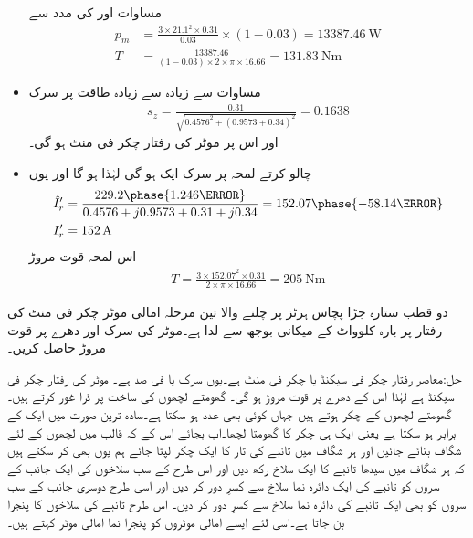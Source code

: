 \begin{itemize}
مساوات   اور   کی مدد سے
\begin{align*}
p_m&=\frac{3\times 21.1^2\times 0.31}{0.03} \times (1-0.03)=\SI{13387.46}{\watt}\\
T&=\frac{13387.46}{(1-0.03) \times 2\times \pi \times 16.66}=\SI{131.83}{\newton \meter}
\end{align*}
%
\item
مساوات   سے زیادہ سے زیادہ طاقت پر سرک
\begin{align*}
s_z=\frac{0.31}{\sqrt{0.4576^2+(0.9573+0.34)^2}}=0.1638
\end{align*}
اور اس پر موٹر کی رفتار  چکر فی منٹ ہو گی۔
\item
چالو کرتے لمحہ پر سرک ایک ہو گی لہٰذا  ہو گا اور یوں
\begin{align*}
\hat{I}_r'&=\frac{229.2 \phase{1.246\degree}}{0.4576+j 0.9573+0.31+j 0.34}=152.07\phase{-58.14\degree}\\
I_r'&=\SI{152}{\ampere}
\end{align*}
اس لمحہ قوت مروڑ
\begin{align*}
T=\frac{3 \times 152.07^2 \times 0.31}{2 \times \pi \times 16.66}=\SI{205}{\newton \meter}
\end{align*}
\end{itemize}
%
دو قطب ستارہ جڑا پچاس ہرٹز پر چلنے والا تین مرحلہ امالی موٹر   چکر فی منٹ کی رفتار پر بارہ کلوواٹ کے میکانی بوجھ سے لدا ہے۔موٹر کی سرک اور دھرے پر قوت مروڑ  حاصل کریں۔

حل:معاصر رفتار  چکر فی سیکنڈ یا  چکر فی منٹ ہے۔یوں سرک   یا  فی صد ہے۔ موٹر کی رفتار   چکر فی سیکنڈ ہے لہٰذا اس کے  دھرے پر قوت مروڑ   ہو گی۔
%
گھومتے لچھوں کی ساخت پر ذرا غور کرتے ہیں۔ گھومتے لچھوں کے   چکر ہوتے ہیں جہاں  کوئی بھی عدد ہو سکتا ہے۔سادہ ترین صورت میں   ایک کے برابر ہو سکتا ہے یعنی ایک ہی چکر کا گھومتا لچھا۔اب بجائے اس کے کہ قالب میں لچھوں کے لئے شگاف بنائے جائیں اور ہر شگاف میں تانبے کی تار کا ایک چکر لپٹا جائے ہم یوں بھی کر سکتے ہیں کہ ہر شگاف میں سیدھا تانبے کا ایک سلاخ رکھ دیں اور اس طرح کے سب سلاخوں کی ایک جانب کے سروں کو تانبے کی ایک دائرہ نما سلاخ سے کسرِ دور کر دیں اور اسی طرح دوسری جانب کے سب سروں کو بھی ایک تانبے کی دائرہ نما سلاخ سے کسرِ  دور کر دیں۔ اس طرح تانبے کی سلاخوں کا پنجرا بن جاتا ہے۔اسی لئے ایسے امالی موٹروں کو پنجرا نما امالی موٹر کہتے ہیں۔

